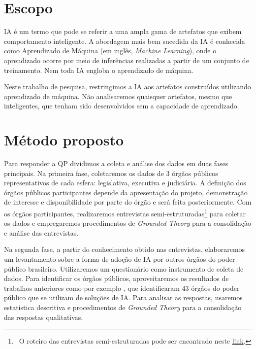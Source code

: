 \documentclass[12pt]{article}
\begin{document}

\section{Escopo}
IA é um termo que pode se referir a uma ampla gama de artefatos que exibem comportamento inteligente. A abordagem mais bem sucedida da IA é conhecida como Aprendizado de Máquina (em inglês, \textit{Machine Learning}), onde o aprendizado ocorre por meio de inferências realizadas a partir de um conjunto de treinamento. Nem toda IA engloba o aprendizado de máquina.

Neste trabalho de pesquisa, restringimos a IA aos artefatos construídos utilizando aprendizado de máquina. Não analisaremos quaisquer artefatos, mesmo que inteligentes, que tenham sido desenvolvidos sem a capacidade de aprendizado.


\section{Método proposto}

Para responder a QP dividimos a coleta e análise dos dados em duas fases principais. Na primeira fase, coletaremos os dados de 3 órgãos públicos representativos de cada esfera: legislativa, executiva e judiciária. A definição dos órgãos públicos participantes depende da apresentação do projeto, demonstração de interesse e disponibilidade por parte do órgão e será feita posteriormente. Com os órgãos participantes, realizaremos entrevistas semi-estruturadas\footnote{~O roteiro das entrevistas semi-estruturadas pode ser encontrado neste \href{https://docs.google.com/document/d/1XO1mXbrIS49Nu2WjoxDkit6h-gZgGcsmll_4swI0RjU/edit?usp=sharing}{link}.} para coletar os dados e empregaremos procedimentos de \textit{Grounded Theory} \cite{Char06} para a consolidação e análise das entrevistas.

Na segunda fase, a partir do conhecimento obtido nas entrevistas, elaboraremos um levantamento sobre a forma de adoção de IA por outros órgãos do poder público brasileiro. Utilizaremos um questionário como instrumento de coleta de dados. Para identificar os órgãos públicos, aproveitaremos os resultados de trabalhos anteriores como por exemplo \cite{SBG2020}, que identificaram 43 órgãos do poder público que se utilizam de soluções de IA. Para analisar as respostas, usaremos estatística descritiva e procedimentos de \textit{Grounded Theory} \cite{Char06} para a consolidação das respostas qualitativas.
\end{document}
